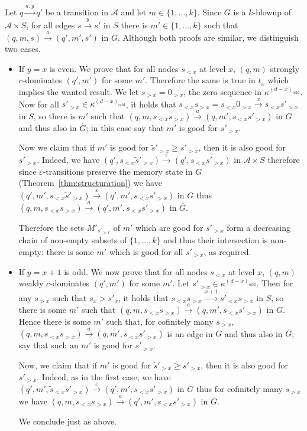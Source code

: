 \documentclass[a4paper,UKenglish,cleveref, thm-restate]{lipics-v2021}
\newcommand{\re}[1]{\xrightarrow{#1}}
\newcommand{\tin}{\text{ in }}
\newcommand{\eps}{\varepsilon}
\newcommand{\odd}{\mathrm{odd}}
\newcommand{\A}{\mathcal{A}}
\begin{document}
\begin{claimproof}
Let $q \re{a:y} q'$ be a transition in $\A$ and let $m \in \{1,\dots,k\}$.
Since $G$ is a $k$-blowup of $\A \times S$, for all edges $s\re y s'$ in $S$ there is $m' \in \{1,\dots,k\}$ such that $(q,m,s) \re a (q',m',s') \tin G$.
Although both proofs are similar, we distinguish two cases.
\begin{itemize}
    \item If $y=x$ is even.
    We prove that for all nodes $s_{< x}$ at level $x$, $(q,m)$ strongly $c$-dominates $(q',m')$ for some $m'$.
    Therefore the same is true in $t_x$ which implies the wanted result.
    We let $s_{> x}=0_{> x}$, the zero sequence in $\kappa^{(d-x)_\odd}$.
    Now for all $s'_{>x} \in \kappa^{(d-x)_\odd}$, it holds that $s_{< x} s_{> x} = s_{< x} 0_{> x} \re x s_{< x} s'_{>x}$ in $S$, so there is $m'$ such that $(q,m,s_{< x} s_{>x}) \re a (q,m',s_{< x} s'_{>x})$ in $G$ and thus also in $\overline G$; in this case say that $m'$ is good for $s'_{> x}$.
    
    Now we claim that if $m'$ is good for $\tilde s'_{> x} \geq s'_{> x}$, then it is also good for $s'_{> x}$.
    Indeed, we have $(q',s_{<x}\tilde s'_{> x}) \re \eps (q',s_{<x}s'_{> x})$ in $\A \times S$ therefore since $\eps$-transitions preserve the memory state in $G$ (Theorem~\ref{thm:structuration}) we have $(q',m',s_{<x} \tilde s'_{> x}) \re \eps (q',m',s_{<x} s'_{>x})$ in $G$ thus $(q,m,s_{<x}s_{> x}) \re a (q',m',s_{<x}s'_{> x})$ in $\overline{G}$.

    Therefore the sets $M'_{s'_{> x}}$ of $m'$ which are good for $s'_{> x}$ form a decreasing chain of non-empty subsets of $\{1,\dots,k\}$ and thus their intersection is non-empty: there is some $m'$ which is good for all $s'_{> x}$, as required.

    \item If $y=x+1$ is odd. 
    We now prove that for all nodes $s_{< x}$ at level $x$, $(q,m)$ weakly $c$-dominates $(q',m')$ for some $m'$.
    Let $s'_{> x} \in \kappa^{(d-x)_\odd}$.
    Then for any $s_{> x}$ such that $s_x > s'_x$, it holds that $s_{< x} s_{> x} \re {x+1} s'_{< x} s_{>x}$ in $S$, so there is some $m'$ such that $(q,m,s_{< x} s_{>x}) \re a (q,m',s_{< x} s'_{>x})$ in $G$.
    Hence there is some $m'$ such that, for cofinitely many $s_{> x}$, $(q,m,s_{< x} s_{>x}) \re a (q,m',s_{< x} s'_{>x})$ is an edge in $G$ and thus also in $\overline G$; say that such an $m'$ is good for $s'_{> x}$.

    Now, we claim that if $m'$ is good for $\tilde s'_{> x} \geq s'_{> x}$, then it is also good for $s'_{> x}$.
    Indeed, as in the first case, we have $(q',m',\tilde s_{<x}s'_{> x}) \re \eps (q',m',s_{<x}s'_{> x})$ in $G$ thus for cofinitely many $s_{> x}$ we have $(q,m,s_{< x}s_{>x}) \re a (q',m',s_{<x} s'_{> x})$ in $\overline{G}$.

    We conclude just as above. \claimqedhere 
\end{itemize}
\end{claimproof}
\end{document}

